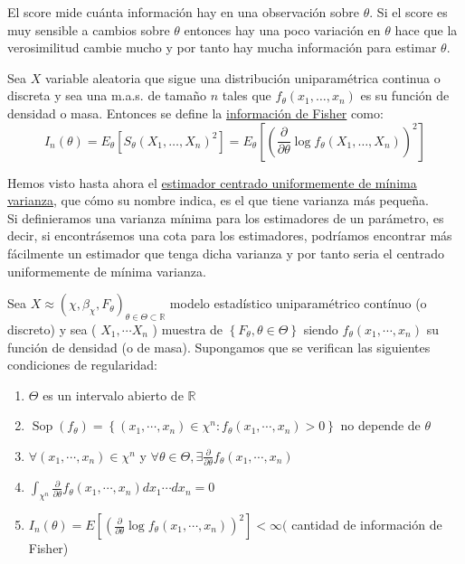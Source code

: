 \begin{observación}
  El score mide cuánta información hay en una observación sobre $\theta$. Si el score es muy sensible a cambios sobre $\theta$ entonces hay una poco variación en $\theta$ hace que la verosimilitud cambie mucho y por tanto hay mucha información para estimar $\theta$. 
\end{observación}

\begin{definición}
  Sea $X$ variable aleatoria que sigue una distribución uniparamétrica continua o discreta y sea una m.a.s. de tamaño $n$ tales que $f_{\theta}(x_1, \ldots, x_n)$ es su función de densidad o masa. Entonces se define la \underline{información de Fisher} como:
  $$I_n(\theta) = E_{\theta}\left[S_{\theta}(X_1, \ldots, X_n)^2\right] = E_{\theta}\left[\left(\frac{\partial}{\partial \theta} \log f_{\theta}(X_1, \ldots, X_n)\right)^2\right]$$
\end{definición}

Hemos visto hasta ahora el \underline{estimador centrado uniformemente de
  mínima varianza}, que cómo su nombre indica, es el que tiene varianza más
pequeña. \\ Si definieramos una varianza mínima para los estimadores de un
parámetro, es decir, si encontrásemos una cota para los estimadores, podríamos
encontrar más fácilmente un estimador que tenga dicha varianza y por tanto
seria el centrado uniformemente de mínima varianza.
\begin{definición}
Sea $X \approx\left(\chi, \beta_{\chi}, F_{\theta}\right)_{\theta \in \Theta \subset \mathbb{R}}$ modelo estadístico uniparamétrico contínuo (o discreto) y sea ( $X_{1}, \cdots X_{n}$ ) muestra de $\left\{F_{\theta}, \theta \in \Theta\right\}$ siendo $f_{\theta}\left(x_{1}, \cdots, x_{n}\right)$ su función de densidad (o de masa). Supongamos que se verifican las siguientes condiciones de regularidad:
\begin{enumerate}
  \item $\Theta$ es un intervalo abierto de $\mathbb{R}$
  \item $\operatorname{Sop}\left(f_{\theta}\right)=\left\{\left(x_{1}, \cdots, x_{n}\right) \in \chi^{n}: f_{\theta}\left(x_{1}, \cdots, x_{n}\right)>0\right\}$ no depende de $\theta$
  \item $\forall\left(x_{1}, \cdots, x_{n}\right) \in \chi^{n}$ y $\forall \theta \in \Theta, \exists \frac{\partial}{\partial \theta} f_{\theta}\left(x_{1}, \cdots, x_{n}\right)$
  \item $\int_{\chi^{n}} \frac{\partial}{\partial \theta} f_{\theta}\left(x_{1}, \cdots, x_{n}\right) d x_{1} \cdots d x_{n}=0$
  \item $I_{n}(\theta)=E\left[\left(\frac{\partial}{\partial \theta} \log f_{\theta}\left(x_{1}, \cdots, x_{n}\right)\right)^{2}\right]<\infty($ cantidad de información de Fisher)
\end{enumerate}
\end{definición}

